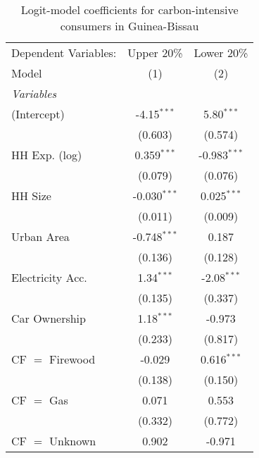 
\begin{table}[htbp!]
   \centering
   \small
   \begin{adjustbox}{width = 1\textwidth, max height = 0.95\textheight, center}
      \begin{threeparttable}[b]
         \caption{\label{tab:Logit_1_GNB} Logit-model coefficients for carbon-intensive consumers in Guinea-Bissau}
         \begin{tabular}{lcc}
            \tabularnewline \midrule \midrule
            Dependent Variables: & Upper 20\%     & Lower 20\%\\   
            Model                & (1)            & (2)\\  
            \midrule
            \emph{Variables}\\
            (Intercept)          & -4.15$^{***}$  & 5.80$^{***}$\\   
                                 & (0.603)        & (0.574)\\   
            HH Exp. (log)        & 0.359$^{***}$  & -0.983$^{***}$\\   
                                 & (0.079)        & (0.076)\\   
            HH Size              & -0.030$^{***}$ & 0.025$^{***}$\\   
                                 & (0.011)        & (0.009)\\   
            Urban Area           & -0.748$^{***}$ & 0.187\\   
                                 & (0.136)        & (0.128)\\   
            Electricity Acc.     & 1.34$^{***}$   & -2.08$^{***}$\\   
                                 & (0.135)        & (0.337)\\   
            Car Ownership        & 1.18$^{***}$   & -0.973\\   
                                 & (0.233)        & (0.817)\\   
            CF $=$ Firewood      & -0.029         & 0.616$^{***}$\\   
                                 & (0.138)        & (0.150)\\   
            CF $=$ Gas           & 0.071          & 0.553\\   
                                 & (0.332)        & (0.772)\\   
            CF $=$ Unknown       & 0.902          & -0.971\\   

\end{tabular}
\end{threeparttable}
\end{adjustbox}
\end{table}
